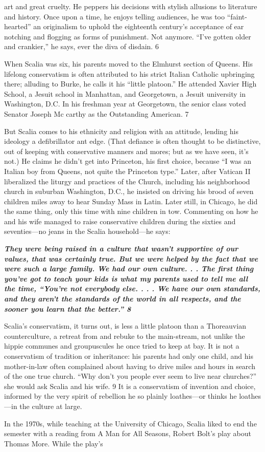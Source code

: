 art and great cruelty. He peppers his decisions with stylish allusions to literature and history. Once upon a time, he enjoys telling audiences, he was too “faint-hearted” an originalism to uphold the eighteenth century’s acceptance of ear notching and flogging as forms of punishment. Not anymore. “I’ve gotten older and crankier,” he says, ever the diva of disdain. {\color{blue} 6 } {\par} When Scalia was six, his parents moved to the Elmhurst section of Queens. His lifelong conservatism is often attributed to his strict Italian Catholic upbringing there; alluding to Burke, he calls it his “little platoon.” He attended Xavier High School, a Jesuit school in Manhattan, and Georgetown, a Jesuit university in Washington, D.C. In his freshman year at Georgetown, the senior class voted Senator Joseph Mc carthy as the Outstanding American. {\color{blue} 7 } {\par} But Scalia comes to his ethnicity and religion with an attitude, lending his ideology a defibrillator ant edge. (That defiance is often thought to be distinctive, out of keeping with conservative manners and mores; but as we have seen, it’s not.) He claims he didn’t get into Princeton, his first choice, because “I was an Italian boy from Queens, not quite the Princeton type.” Later, after Vatican II liberalized the liturgy and practices of the Church, including his neighborhood church in suburban Washington, D.C., he insisted on driving his brood of seven children miles away to hear Sunday Mass in Latin. Later still, in Chicago, he did the same thing, only this time with nine children in tow. Commenting on how he and his wife managed to raise conservative children during the sixties and seventies—no jeans in the Scalia household—he says:{\par} {\textbf{\textit{They were being raised in a culture that wasn’t supportive of our values, that was certainly true. But we were helped by the fact that we were such a large family. We had our own culture. . . The first thing you’ve got to teach your kids is what my parents used to tell me all the time, “You’re not everybody else. . . . We have our own standards, and they aren’t the standards of the world in all respects, and the sooner you learn that the better.” {\color{blue} 8 } } } }{\par} Scalia’s conservatism, it turns out, is less a little platoon than a Thoreauvian counterculture, a retreat from and rebuke to the main-stream, not unlike the hippie communes and groupuscules he once tried to keep at bay. It is not a conservatism of tradition or inheritance: his parents had only one child, and his mother-in-law often complained about having to drive miles and hours in search of the one true church. “Why don’t you people ever seem to live near churches?” she would ask Scalia and his wife. {\color{blue} 9 } It is a conservatism of invention and choice, informed by the very spirit of rebellion he so plainly loathes—or thinks he loathes—in the culture at large.{\par} In the 1970s, while teaching at the University of Chicago, Scalia liked to end the semester with a reading from A Man for All Seasons, Robert Bolt’s play about Thomas More. While the play’s 